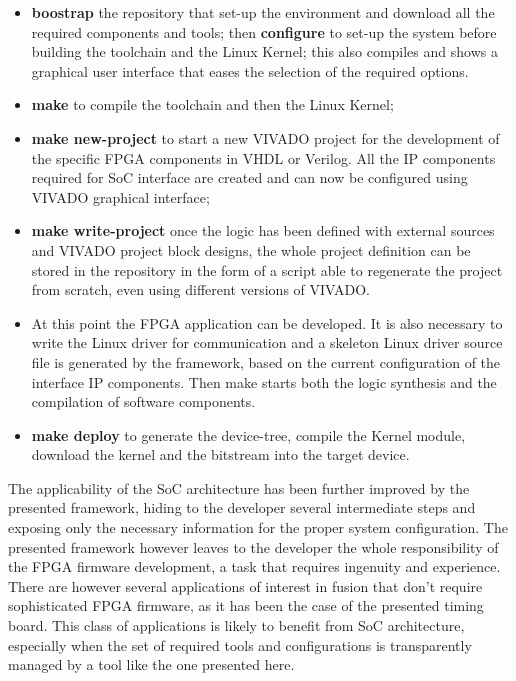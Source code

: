 \begin{itemize}
    \item \textbf{boostrap} the repository that set-up the environment and download all the required components and tools;
    then \textbf{configure} to set-up the system before building the toolchain and the Linux Kernel; this also compiles and shows a graphical user interface that eases the selection of the required options.

    \item \textbf{make} to compile the toolchain and then the Linux Kernel;
    
    \item \textbf{make new-project} to start a new VIVADO project for the development of the specific FPGA components in VHDL or Verilog. All the IP components required for SoC interface are created and can now be configured using VIVADO graphical        interface;
    
    \item \textbf{make write-project} once the logic has been defined with external sources and VIVADO project block designs, the whole project definition can be stored in the repository in the form of a script able to regenerate the project from scratch, even using different versions of VIVADO.
    
    \item At this point the FPGA application can be developed. It is also necessary to write the Linux driver for communication and a skeleton Linux driver source file is generated by the framework, based on the current configuration of the interface IP components. Then make starts both the logic synthesis and the compilation of software components.
    
    \item \textbf{make deploy} to generate the device-tree, compile the Kernel module, download the kernel and the bitstream into the target device.
    
\end{itemize}

The applicability of the SoC architecture has been further improved by the presented framework, hiding to the developer several intermediate steps and exposing only the necessary information for the proper system configuration. The presented framework however leaves to the developer the whole responsibility of the FPGA firmware development, a task that requires ingenuity and experience. 
There are however several applications of interest in fusion that don’t require sophisticated FPGA firmware, as it has been the case of the presented timing board. This class of applications is likely to benefit from SoC architecture, especially when the set of required tools and configurations is transparently managed by a tool like the one presented here.




